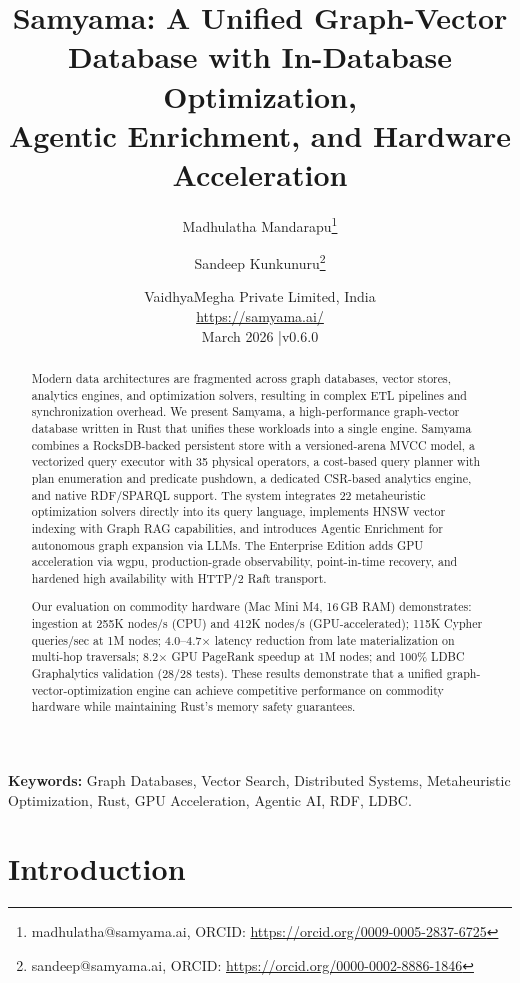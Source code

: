 \documentclass[11pt]{article}
\title{Samyama: A Unified Graph-Vector Database with In-Database Optimization,\\Agentic Enrichment, and Hardware Acceleration}
\author{
  Madhulatha Mandarapu\thanks{madhulatha@samyama.ai, ORCID: \url{https://orcid.org/0009-0005-2837-6725}} \and
  Sandeep Kunkunuru\thanks{sandeep@samyama.ai, ORCID: \url{https://orcid.org/0000-0002-8886-1846}}
}
\date{%
  VaidhyaMegha Private Limited, India\\[2pt]
  \url{https://samyama.ai/}\\[8pt]
  March 2026 \quad|\quad v0.6.0
}
\begin{document}
\maketitle

\begin{abstract}
Modern data architectures are fragmented across graph databases, vector stores, analytics engines, and optimization solvers, resulting in complex ETL pipelines and synchronization overhead. We present Samyama, a high-performance graph-vector database written in Rust that unifies these workloads into a single engine. Samyama combines a RocksDB-backed persistent store with a versioned-arena MVCC model, a vectorized query executor with 35 physical operators, a cost-based query planner with plan enumeration and predicate pushdown, a dedicated CSR-based analytics engine, and native RDF/SPARQL support. The system integrates 22 metaheuristic optimization solvers directly into its query language, implements HNSW vector indexing with Graph RAG capabilities, and introduces Agentic Enrichment for autonomous graph expansion via LLMs. The Enterprise Edition adds GPU acceleration via wgpu, production-grade observability, point-in-time recovery, and hardened high availability with HTTP/2 Raft transport.

Our evaluation on commodity hardware (Mac Mini M4, 16\,GB RAM) demonstrates: ingestion at 255K nodes/s (CPU) and 412K nodes/s (GPU-accelerated); 115K Cypher queries/sec at 1M nodes; 4.0--4.7$\times$ latency reduction from late materialization on multi-hop traversals; 8.2$\times$ GPU PageRank speedup at 1M nodes; and 100\% LDBC Graphalytics validation (28/28 tests). These results demonstrate that a unified graph-vector-optimization engine can achieve competitive performance on commodity hardware while maintaining Rust's memory safety guarantees.
\end{abstract}

\noindent\textbf{Keywords:} Graph Databases, Vector Search, Distributed Systems, Metaheuristic Optimization, Rust, GPU Acceleration, Agentic AI, RDF, LDBC.

\section{Introduction}
\end{document}
